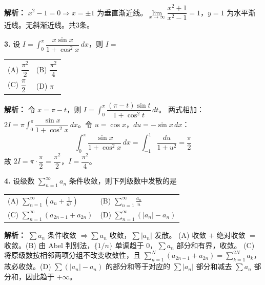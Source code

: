 \ifshowsolutions\par\noindent\textbf{解析：} $x^2-1=0 \Rightarrow x=\pm 1$ 为垂直渐近线。$\lim\limits_{x\to\infty} \dfrac{x^2+1}{x^2-1}=1$，$y=1$ 为水平渐近线。无斜渐近线。共3条。\else \answerarea \fi

\vspace{8pt}

\textbf{3.} 设 $I = \displaystyle\int_{0}^{\pi} \dfrac{x\sin x}{1+\cos^2 x}\,dx$，则 $I =$
\begin{center}
\begin{tabular}{ll}
(A) $\dfrac{\pi^2}{2}$ & (B) $\dfrac{\pi^2}{4}$ \\[6pt]
(C) $\dfrac{\pi}{2}$ & (D) $\pi$
\end{tabular}
\end{center}

\ifshowsolutions\par\noindent\textbf{解析：} 令 $x = \pi - t$，则 $I = \displaystyle\int_{0}^{\pi} \dfrac{(\pi-t)\sin t}{1+\cos^2 t}\,dt$。
两式相加：$2I = \pi\displaystyle\int_{0}^{\pi} \dfrac{\sin x}{1+\cos^2 x}\,dx$。令 $u=\cos x$，$du=-\sin x\,dx$：
\[
\int_{0}^{\pi} \dfrac{\sin x}{1+\cos^2 x}\,dx = \int_{-1}^{1} \dfrac{du}{1+u^2} = \frac{\pi}{2}
\]
故 $2I = \pi \cdot \dfrac{\pi}{2} = \dfrac{\pi^2}{2}$，$I = \dfrac{\pi^2}{4}$。\else \answerarea \fi

\vspace{8pt}

\textbf{4.} 设级数 $\displaystyle\sum_{n=1}^{\infty} a_n$ 条件收敛，则下列级数中发散的是
\begin{center}
\begin{tabular}{ll}
(A) $\displaystyle\sum_{n=1}^{\infty} \left(a_n + \frac{1}{n^2}\right)$ & (B) $\displaystyle\sum_{n=1}^{\infty} \frac{a_n}{n}$ \\[6pt]
(C) $\displaystyle\sum_{n=1}^{\infty} (a_{2n-1} + a_{2n})$ & (D) $\displaystyle\sum_{n=1}^{\infty} (|a_n| - a_n)$
\end{tabular}
\end{center}

\ifshowsolutions\par\noindent\textbf{解析：} $\sum a_n$ 条件收敛 $\Rightarrow \sum a_n$ 收敛，$\sum |a_n|$ 发散。
(A) 收敛 $+$ 绝对收敛 $=$ 收敛。(B) 由 Abel 判别法，$\{1/n\}$ 单调趋于 $0$，$\sum a_n$ 部分和有界，收敛。
(C) 将原级数按相邻两项分组不改变收敛性，且 $\sum_{n=1}^{N}(a_{2n-1}+a_{2n})=\sum_{k=1}^{2N}a_k$，故必收敛。(D) $\sum(|a_n|-a_n)$ 的部分和等于对应的 $\sum|a_n|$ 部分和减去 $\sum a_n$ 部分和，因此趋于 $+\infty$。\else \answerarea \fi

